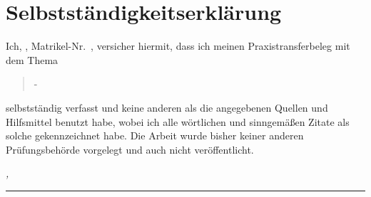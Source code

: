 %
\chapter*{Selbstständigkeitserklärung}
\label{sec:Selbstständigkeitserklärung}
\thispagestyle{empty}

Ich, \thesisName, Matrikel-Nr.\ \thesisMatrikel, versicher hiermit, dass ich meinen Praxistransferbeleg mit dem Thema
\begin{quote}
\textit{\thesisTitle} - \textit{\thesisSubtitle}
\end{quote}
selbstständig verfasst und keine anderen als die angegebenen Quellen und Hilfsmittel benutzt habe, wobei ich alle wörtlichen und sinngemäßen Zitate als solche gekennzeichnet habe. Die Arbeit wurde bisher keiner anderen Prüfungsbehörde vorgelegt und auch nicht veröffentlicht.

\bigskip

\noindent\textit{\thesisUniversityCity, \thesisDate}

\smallskip

\begin{flushright}
	\begin{minipage}{5cm}
		\rule{\textwidth}{1pt}
		\centering\thesisName
	\end{minipage}
\end{flushright}

